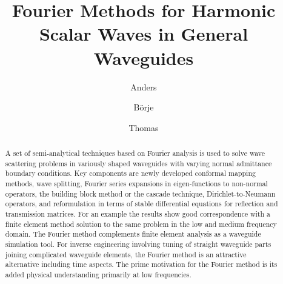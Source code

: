 \documentclass[numreferences]{kluwer}
\begin{document}
\begin{opening}
  \title{Fourier Methods for Harmonic Scalar Waves in General
    Waveguides}

  \author{Anders
    }
   \author{B\"orje
    }
   \author{Thomas
    } 
  \begin{abstract}
    A set of semi-analytical techniques based on Fourier analysis is
    used to solve wave scattering problems in variously shaped
    waveguides with varying normal admittance boundary conditions. Key
    components are newly developed conformal mapping methods, wave
    splitting, Fourier series expansions in eigen-functions to
    non-normal operators, the building block method or the cascade
    technique, Dirichlet-to-Neumann operators, and reformulation in
    terms of stable differential equations for reflection and
    transmission matrices. For an example the results show good
    correspondence with a finite element method solution to the same
    problem in the low and medium frequency domain. The Fourier method
    complements finite element analysis as a waveguide simulation
    tool.  For inverse engineering involving tuning of straight
    waveguide parts joining complicated waveguide elements, the
    Fourier method is an attractive alternative including time
    aspects. The prime motivation for the Fourier method is its added
    physical understanding primarily at low frequencies.
  \end{abstract}
\end{opening}
\end{document}
